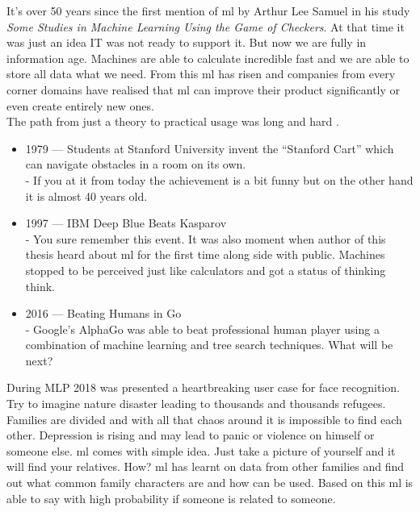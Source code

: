 \documentclass[thesis=M,english]{FITthesis}[2012/06/26]
\begin{document}
It's over 50 years since the first mention of \acrshort{ml} by Arthur Lee Samuel in his study \textit{Some Studies in Machine Learning Using the Game of Checkers}\cite{ml_first_occurence}. At that time it was just an idea IT was not ready to support it. But now we are fully in information age. Machines are able to calculate incredible fast and we are able to store all data what we need. From this \acrshort{ml} has risen and companies from every corner domains have realised that \acrshort{ml} can improve their product significantly or even create entirely new ones.\\

The path from just a theory to practical usage was long and hard \cite{ml_history}.\\

\begin{itemize}[nosep]
	\item 1979 — Students at Stanford University invent the “Stanford Cart” which can navigate obstacles in a room on its own.\\
	- If you at it from today the achievement is a bit funny but on the other hand it is almost 40 years old.
	\item 1997 — IBM Deep Blue Beats Kasparov\\
	- You sure remember this event. It was also  moment when author of this thesis heard about \acrshort{ml} for the first time along side with public. Machines stopped to be perceived just like calculators and got a status of thinking think.
	\item 2016 — Beating Humans in Go\\
	 - Google's AlphaGo was able to beat professional human player using a combination of machine learning and tree search techniques. What will be next? 
\end{itemize}

\pagebreak
During MLP 2018 \cite{mlp2018_microsoft} was presented a heartbreaking user case for face recognition. Try to imagine nature disaster leading to thousands and thousands refugees. Families are divided and with all that chaos around it is impossible to find each other. Depression is rising and may lead to panic or violence on himself or someone else. \acrshort{ml} comes with simple idea. Just take a picture of yourself and it will find your relatives. How? \acrshort{ml} has learnt on data from other families and find out what common family characters are and how can be used. Based on this \acrshort{ml} is able to say with high probability if someone is related to someone. \\
\end{document}
